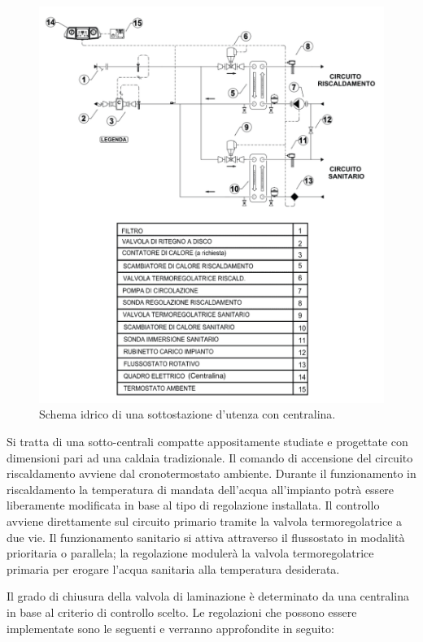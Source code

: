 \documentclass[laurea,oneside,11pt]{USiena_tesiLM}
\begin{document}
\begin{figure}[!ht]
\centering
\includegraphics[width=\textwidth]{figure/schema_centralina2} 
\caption{Schema idrico di una sottostazione d'utenza con centralina.}
\label{fig:schema_centralina2}
\end{figure}

Si tratta di una sotto-centrali compatte appositamente studiate e progettate con dimensioni pari ad una caldaia tradizionale.
Il comando di accensione del circuito riscaldamento avviene dal cronotermostato ambiente. Durante il funzionamento in riscaldamento la temperatura di mandata dell'acqua all'impianto potrà essere liberamente modificata in base al tipo di regolazione installata. Il controllo  avviene direttamente sul circuito primario tramite la valvola termoregolatrice a due vie.
Il funzionamento sanitario si attiva attraverso il flussostato in modalità prioritaria o parallela; la regolazione modulerà la valvola termoregolatrice primaria per erogare l’acqua sanitaria alla temperatura desiderata.

Il grado di chiusura della valvola di laminazione è determinato da una centralina in base al criterio di controllo scelto. Le regolazioni che possono essere implementate sono le seguenti e verranno approfondite in seguito:
\end{document}
